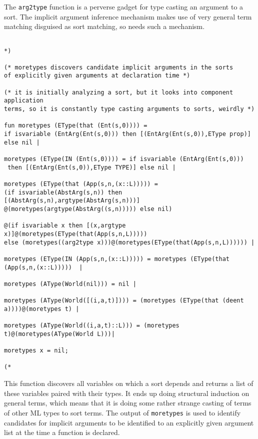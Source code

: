 \documentclass{article}
\begin{document}
The {\tt arg2type} function is a perverse gadget for type casting an argument to a sort.  The implicit argument inference mechanism makes use of very general term matching disguised as sort matching, so needs such a mechanism.

\begin{verbatim}

*)

(* moretypes discovers candidate implicit arguments in the sorts
of explicitly given arguments at declaration time *)

(* it is initially analyzing a sort, but it looks into component application
terms, so it is constantly type casting arguments to sorts, weirdly *)

fun moretypes (EType(that (Ent(s,0)))) = 
if isvariable (EntArg(Ent(s,0))) then [(EntArg(Ent(s,0)),EType prop)] else nil |

moretypes (EType(IN (Ent(s,0)))) = if isvariable (EntArg(Ent(s,0)))
 then [(EntArg(Ent(s,0)),EType TYPE)] else nil |

moretypes (EType(that (App(s,n,(x::L))))) = 
(if isvariable(AbstArg(s,n)) then [(AbstArg(s,n),argtype(AbstArg(s,n)))]
@(moretypes(argtype(AbstArg((s,n))))) else nil)

@(if isvariable x then [(x,argtype x)]@(moretypes(EType(that(App(s,n,L)))))
else (moretypes((arg2type x)))@(moretypes(EType(that(App(s,n,L)))))) |

moretypes (EType(IN (App(s,n,(x::L))))) = moretypes (EType(that (App(s,n,(x::L)))))  |

moretypes (AType(World(nil))) = nil |

moretypes (AType(World([(i,a,t)]))) = (moretypes (EType(that (deent a))))@(moretypes t) |

moretypes (AType(World((i,a,t)::L))) = (moretypes t)@(moretypes(AType(World L)))|

moretypes x = nil;

(*

\end{verbatim}

This function discovers all variables on which a sort depends and returns a list of these variables paired with their types.  It ends up doing structural induction on
general terms, which means that it is doing some rather strange casting of terms of other ML types to sort terms.  The output of {\tt moretypes} is used to identify candidates for implicit arguments to be identified to an explicitly given argument list at the time a function is declared.
\end{document}
